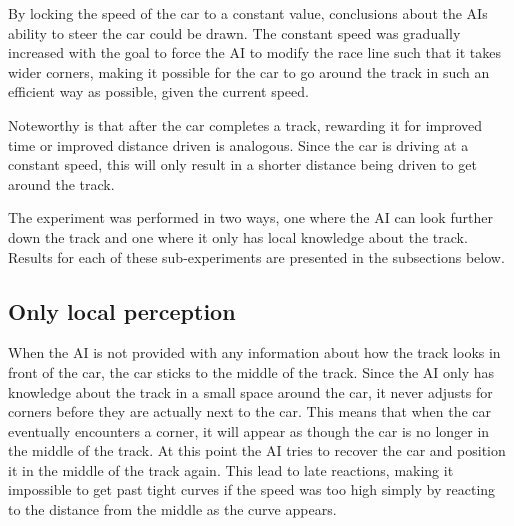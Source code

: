 By locking the speed of the car to a constant value, conclusions about the AIs ability to steer the car could be drawn. The constant speed was gradually increased with the goal to force the AI to modify the race line such that it takes wider corners, making it possible for the car to go around the track in such an efficient way as possible, given the current speed.

Noteworthy is that after the car completes a track, rewarding it for improved time or improved distance driven is analogous. Since the car is driving at a constant speed, this will only result in a shorter distance being driven to get around the track.

The experiment was performed in two ways, one where the AI can look further down the track and one where it only has local knowledge about the track. Results for each of these sub-experiments are presented in the subsections below.



\subsection{Only local perception}
When the AI is not provided with any information about how the track looks in front of the car, the car sticks to the middle of the track. Since the AI only has knowledge about the track in a small space around the car, it never adjusts for corners before they are actually next to the car. This means that when the car eventually encounters a corner, it will appear as though the car is no longer in the middle of the track. At this point the AI tries to recover the car and position it in the middle of the track again. This lead to late reactions, making it impossible to get past tight curves if the speed was too high simply by reacting to the distance from the middle as the curve appears.

